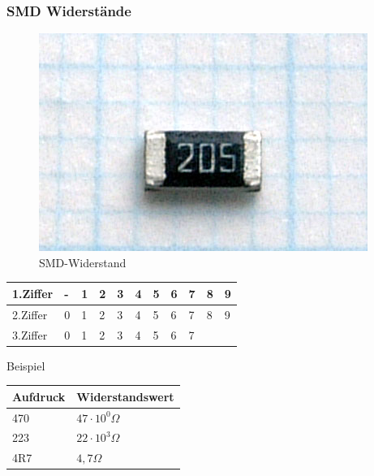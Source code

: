 \begin{frame}
  \frametitle{SMD Widerstände}
  \begin{center}
    \begin{figure}
      \includegraphics[width=\textwidth,height=.2\textheight,keepaspectratio]{e04/Rsistor_SMD.jpg}
      \caption{SMD-Widerstand \cite{smd}}
      \label{fig_smd}
    \end{figure}
  \end{center}

  \begin{center}
    \begin{tabular}{l||l|l|l|l|l|l|l|l|l|l}\hline
      1.Ziffer & - & 1 &2 & 3 & 4 & 5 & 6 & 7 & 8 & 9 \\ \hline
      2.Ziffer & 0 & 1 &2 & 3 & 4 & 5 & 6 & 7 & 8 & 9 \\ \hline
      3.Ziffer & 0 & 1 &2 & 3 & 4 & 5 & 6 & 7 &  &  \\ \hline
    \end{tabular}
  \end{center}
  \pause
  \begin{exampleblock}{Beispiel}
    \scriptsize
    \begin{center}
      \begin{tabular}{l|l}
        Aufdruck & Widerstandswert \\ \hline
        470 & $47 \cdot 10^{0} \Omega$ \\
        223 & $22 \cdot 10^{3} \Omega$ \\
        4R7 & $4,7 \Omega$ \\
      \end{tabular}
    \end{center}
  \end{exampleblock}

\end{frame}

